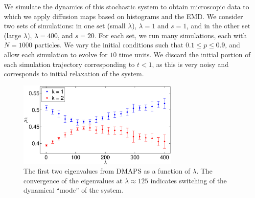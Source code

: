 \documentclass[prl, reprint, final, showkeys]{revtex4-1}
\begin{document}



We simulate the dynamics of this stochastic system to obtain microscopic data to which we apply diffusion maps based on histograms and the EMD.
%
We consider two sets of simulations:
in one set (small $\lambda$), $\lambda = 1$ and $s=1$, and in the other set (large $\lambda$), $\lambda = 400$, and $s=20$.
%
For each set, we run many simulations, each with $N=1000$ particles.
%
We vary the initial conditions such that $0.1 \le p  \le 0.9$, and allow each simulation to evolve for $10$ time units.
%
We discard the initial portion of each simulation trajectory corresponding to $t < 1$, as this is very noisy and corresponds to initial relaxation of the system.

\begin{figure}[t] 
\includegraphics[width=8cm]{detect_change_eigenvalues}
\caption{The first two eigenvalues from DMAPS as a function of $\lambda$. The convergence of the eigenvalues at $\lambda \approx 125$ indicates switching of the dynamical ``mode'' of the system.}
\label{fig:detect_change}
\end{figure}
\end{document}
